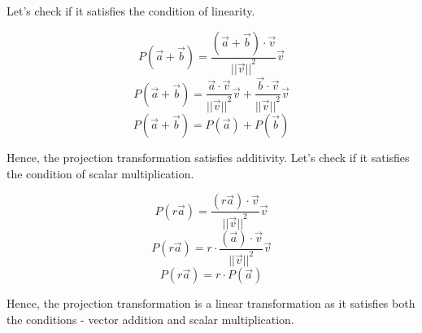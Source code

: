 \begin{enumerate}
{    Let's check if it satisfies the condition of linearity.

    $$P(\vec{a} + \vec{b}) = \frac{(\vec{a} + \vec{b}) \cdot \vec{v}}{{||\vec{v}||}^2} \vec{v}$$
    $$P(\vec{a} + \vec{b}) = \frac{\vec{a} \cdot \vec{v}}{{||\vec{v}||}^2} \vec{v} + \frac{\vec{b} \cdot \vec{v}}{{||\vec{v}||}^2} \vec{v}$$
    $$P(\vec{a} + \vec{b}) = P(\vec{a}) + P(\vec{b})$$

    Hence, the projection transformation satisfies additivity. Let's check if it satisfies the condition of scalar multiplication.

    $$P(r\vec{a}) = \frac{(r\vec{a}) \cdot \vec{v}}{{||\vec{v}||}^2} \vec{v}$$
    $$P(r\vec{a}) = r \cdot \frac{(\vec{a}) \cdot \vec{v}}{{||\vec{v}||}^2} \vec{v}$$
    $$P(r\vec{a}) = r \cdot P(\vec{a})$$

    Hence, the projection transformation is a linear transformation as it satisfies both the conditions - vector addition and scalar multiplication.
}

\end{enumerate}